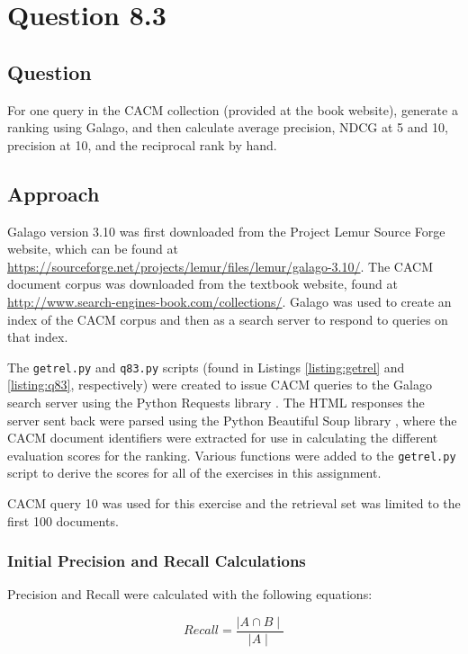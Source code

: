 \section{Question 8.3}


\subsection{Question}
For one query in the CACM collection (provided at the book website), generate a ranking using Galago, and then calculate average precision, NDCG at 5 and 10, precision at 10, and the reciprocal rank by hand.


\subsection{Approach}
Galago version 3.10 was first downloaded from the Project Lemur Source Forge website, which can be found at \url{https://sourceforge.net/projects/lemur/files/lemur/galago-3.10/}.  The CACM document corpus was downloaded from the textbook website, found at \url{http://www.search-engines-book.com/collections/}.  Galago was used to create an index of the CACM corpus and then as a search server to respond to queries on that index.

The \texttt{getrel.py} and \texttt{q83.py} scripts (found in Listings \ref{listing:getrel} and \ref{listing:q83}, respectively) were created to issue CACM queries to the Galago search server using the Python Requests library \cite{py:requests}.  The HTML responses the server sent back were parsed using the Python Beautiful Soup library \cite{py:beautifulsoup}, where the CACM document identifiers were extracted for use in calculating the different evaluation scores for the ranking.  Various functions were added to the \texttt{getrel.py} script to derive the scores for all of the exercises in this assignment.

CACM query 10 was used for this exercise and the retrieval set was limited to the first 100 documents.


\subsubsection{Initial Precision and Recall Calculations}
Precision and Recall were calculated with the following equations:

\begin{equation}
\nonumber
Recall = \frac{\mid A \cap B \mid}{\mid A \mid}
\end{equation}

